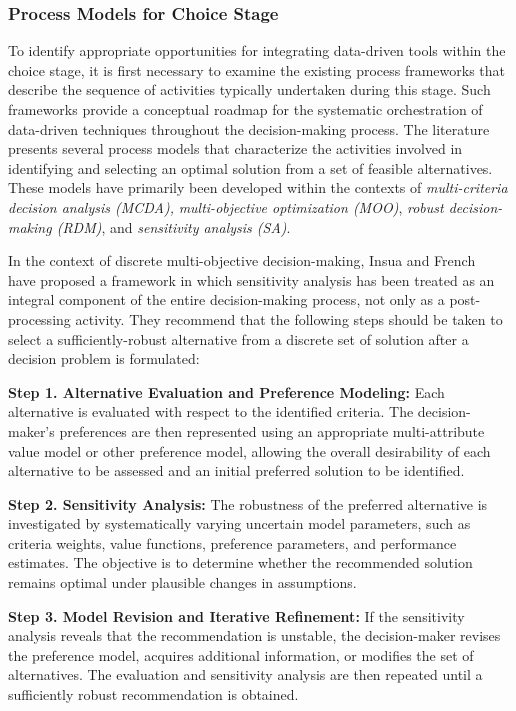 \documentclass{sfuthesis}
\begin{document}
\subsubsection{Process Models for Choice Stage}
To identify appropriate opportunities for integrating data-driven tools within the choice stage, it is first necessary to examine the existing process frameworks that describe the sequence of activities typically undertaken during this stage. Such frameworks provide a conceptual roadmap for the systematic orchestration of data-driven techniques throughout the decision-making process. The literature presents several process models that characterize the activities involved in identifying and selecting an optimal solution from a set of feasible alternatives. These models have primarily been developed within the contexts of \textit{multi-criteria decision analysis (MCDA),} \textit{multi-objective optimization (MOO)},\textit{ robust decision-making (RDM)}, and \textit{sensitivity analysis (SA)}.\par
In the context of discrete multi-objective decision-making, Insua and French~\cite{insua1991framework} have proposed a framework in which sensitivity analysis has been treated as an integral component of the entire decision-making process, not only as a post-processing activity. They recommend that the following steps should be taken to select a sufficiently-robust alternative from a discrete set of solution after a decision problem is formulated:\par
\textbf{Step 1. Alternative Evaluation and Preference Modeling:} Each alternative is evaluated with respect to the identified criteria. The decision-maker's preferences are then represented using an appropriate multi-attribute value model or other preference model, allowing the overall desirability of each alternative to be assessed and an initial preferred solution to be identified.

\textbf{Step 2. Sensitivity Analysis:} The robustness of the preferred alternative is investigated by systematically varying uncertain model parameters, such as criteria weights, value functions, preference parameters, and performance estimates. The objective is to determine whether the recommended solution remains optimal under plausible changes in assumptions.

\textbf{Step 3. Model Revision and Iterative Refinement:} If the sensitivity analysis reveals that the recommendation is unstable, the decision-maker revises the preference model, acquires additional information, or modifies the set of alternatives. The evaluation and sensitivity analysis are then repeated until a sufficiently robust recommendation is obtained.
\end{document}
